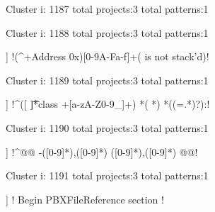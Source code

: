 Cluster i: 1187
total projects:3
total patterns:1
\begin{multicols}{1}
\end{multicols}







Cluster i: 1188
total projects:3
total patterns:1
\begin{multicols}{1}
\begin{description}[noitemsep,topsep=0pt]
\item [[3] ] \cverb!(^\s+Address 0x)[0-9A-Fa-f]+( is not stack'd)!
\end{description}
\end{multicols}







Cluster i: 1189
total projects:3
total patterns:1
\begin{multicols}{1}
\begin{description}[noitemsep,topsep=0pt]
\item [[3] ] \cverb!^([ \t]*class +[a-zA-Z0-9_]+) *( *) *((=.*)?):!
\end{description}
\end{multicols}







Cluster i: 1190
total projects:3
total patterns:1
\begin{multicols}{1}
\begin{description}[noitemsep,topsep=0pt]
\item [[3] ] \cverb!^@@ -([0-9]*),([0-9]*) \+([0-9]*),([0-9]*) @@!
\end{description}
\end{multicols}







Cluster i: 1191
total projects:3
total patterns:1
\begin{multicols}{1}
\begin{description}[noitemsep,topsep=0pt]
\item [[3] ] \cverb!\/\* Begin PBXFileReference section \*\/\n!
\end{description}
\end{multicols}







